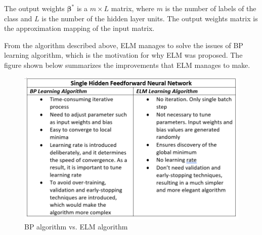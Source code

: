 \documentclass[a4paper, 14pt]{extarticle}
\begin{document}
\par The output weights \(\mathbf{\beta}^*\) is a \(m\times L\) matrix, where \(m\) is the number of labels of the class and \(L\) is the number of the hidden layer units. The output weights matrix is the approximation mapping of the input matrix. 
\par From the algorithm described above, ELM manages to solve the issues of BP learning algorithm, which is the motivation for why ELM was proposed. The figure shown below summarizes the improvements that ELM manages to make. 
\begin{figure}[H]
\centering
\includegraphics[width=\textwidth]{2.png}
\caption{\label{fig:BP vs ELM}BP algorithm vs. ELM algorithm}
\end{figure}
\end{document}
